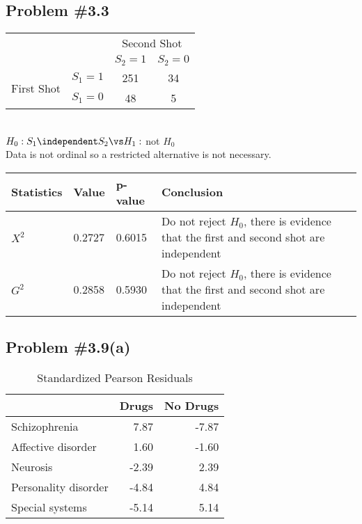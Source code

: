 \documentclass[12pt, letterpaper]{article}
\begin{document}
\subsection*{Problem {\#}3.3}  

\begin{wraptable}{l}{3in} 
\vspace{-12pt} 
\begin{tabular}{c l cc }
							&			& \multicolumn{2}{c}{Second Shot} \\
							&			& $S_2 = 1$	& $S_2 = 0$ 	\\ \cline{3-4} 
\multirow{2}{*}{First Shot} & $S_1 = 1$	& \multicolumn{1}{|c}{251}		& \multicolumn{1}{|c|}{34}\\ \cline{3-4} 
							& $S_1 = 0$ 	& \multicolumn{1}{|c}{48}		& \multicolumn{1}{|c|}{5} \\ \cline{3-4}
\end{tabular}
\vspace{-60pt} 
\end{wraptable} 

\quad \\[12pt]
$H_0: S_1 \independent S_2 \vs H_1:$ not $H_0$  
\\[36pt]
Data is not ordinal so a restricted alternative is not necessary.  

\begin{tabu}{X[l, 1] X[l, 1] X[l, 1] X[l, 4]}
\textbf{Statistics} & \textbf{Value} & \textbf{p-value} & \textbf{Conclusion} \\ \hline 
$X^2$ & 0.2727 & 0.6015 & Do not reject $H_0$, there is evidence that the first and second shot are independent \\ \hline
$G^2$ & 0.2858 & 0.5930 & Do not reject $H_0$, there is evidence that the first and second shot are independent \\ \hline 
\end{tabu}

\subsection*{Problem {\#}3.9(a)}

\begin{wraptable}{l}{3in} 
	\vspace{-12pt} 
	\caption{Standardized Pearson Residuals} 
	\centering
\begin{tabular}{lrr}
	\hline
	& Drugs & No Drugs \\ 
	\hline
	Schizophrenia & 7.87 & -7.87 \\ 
	Affective disorder & 1.60 & -1.60 \\ 
	Neurosis & -2.39 & 2.39 \\ 
	Personality disorder & -4.84 & 4.84 \\ 
	Special systems & -5.14 & 5.14 \\ 
	\hline
\end{tabular}
\end{wraptable}
\end{document}
